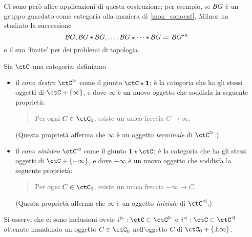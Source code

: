 Ci sono però altre applicazioni di questa costruzione: per esempio, se \(\mathcal{B} G\) è un gruppo guardato come categoria alla maniera di \ref{mon_sonocat}, Milnor \cite{milnor1,milnor2} ha studiato la successione \[\mathcal{B} G, \mathcal{B} G\star\mathcal{B} G, \dots, \mathcal{B} G \star\dots\star \mathcal{B} G =:\mathcal{B} G^{\star n}\] e il suo `limite' per dei problemi di topologia.
\begin{definition}\label{def_cono_su_C}
	Sia \(\ctC\) una categoria; definiamo
	\begin{itemize}
		\item il \emph{cono destro} \(\ctC^\rhd\) come il giunto \(\ctC\star \ctTerm\); è la categoria che ha gli stessi oggetti di \(\ctC + \{\infty\}\), e dove \(\infty\) è un nuovo oggetto che soddisfa la seguente proprietà:
		      \begin{quote}
			      Per ogni \(C\in\ctC_0\), esiste un unica freccia \(C\to\infty\).
		      \end{quote}
		      (Questa proprietà afferma che \(\infty\) è un oggetto \emph{terminale} di \(\ctC^\rhd\).)
		\item il \emph{cono sinistro} \(\ctC^\lhd\) come il giunto \(\ctTerm\star \ctC\); è la categoria che ha gli stessi oggetti di \(\ctC + \{-\infty\}\), e dove \(-\infty\) è un nuovo oggetto che soddisfa la seguente proprietà:
		      \begin{quote}
			      Per ogni \(C\in\ctC_0\), esiste un unica freccia \(-\infty \to C\).
		      \end{quote}
		      (Questa proprietà afferma che \(\infty\) è un oggetto \emph{iniziale} di \(\ctC^\lhd\).)
	\end{itemize}
	Si osservi che ci sono inclusioni ovvie \(i^\rhd : \ctC \subset \ctC^\rhd\) e \(i^\lhd : \ctC \subset \ctC^\lhd\) ottenute mandando un oggetto \(C \in\ctC_0\) nell'oggetto \(C\) di \(\ctC_0 + \{\pm\infty\}\).
\end{definition}
